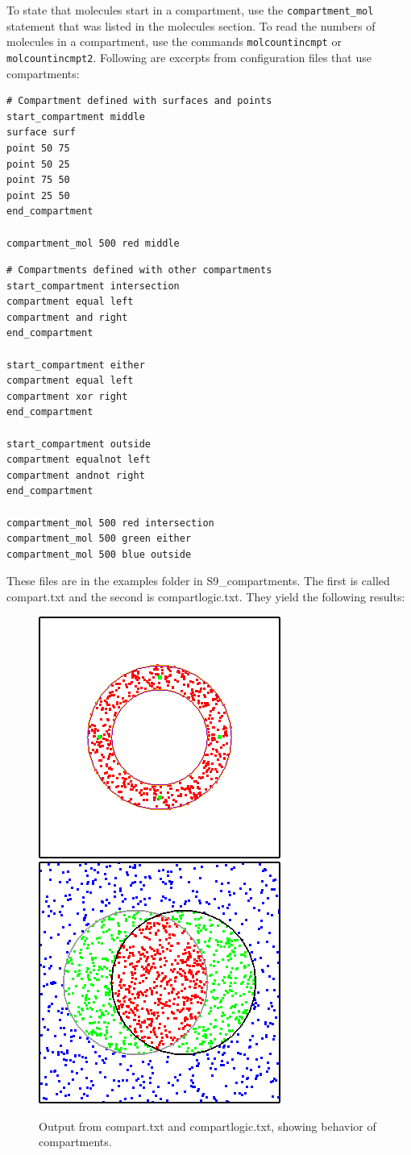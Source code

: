 \documentclass {scrbook}
\newcommand {\ttt} {\texttt}
\begin{document}
To state that molecules start in a compartment, use the \ttt{compartment\_mol} statement that was listed in the molecules section. To read the numbers of molecules in a compartment, use the commands \ttt{molcountincmpt} or \ttt{molcountincmpt2}.
Following are excerpts from configuration files that use compartments:

\begin{lstlisting}[style=SSAC]
# Compartment defined with surfaces and points
start_compartment middle
surface surf
point 50 75
point 50 25
point 75 50
point 25 50
end_compartment

compartment_mol 500 red middle
\end{lstlisting}

\begin{lstlisting}[style=SSAC]
# Compartments defined with other compartments
start_compartment intersection
compartment equal left
compartment and right
end_compartment

start_compartment either
compartment equal left
compartment xor right
end_compartment

start_compartment outside
compartment equalnot left
compartment andnot right
end_compartment

compartment_mol 500 red intersection
compartment_mol 500 green either
compartment_mol 500 blue outside
\end{lstlisting}

These files are in the examples folder in S9\_compartments. The first is called compart.txt and the second is compartlogic.txt. They yield the following results:

\begin{figure}[h]
\centering
\includegraphics[height=5 cm]{figures/image62.png}
\includegraphics[height=5 cm]{figures/image63.png}
\caption{Output from compart.txt and compartlogic.txt, showing behavior of compartments.}
\label{fig:compart}
\end{figure}
\end{document}
